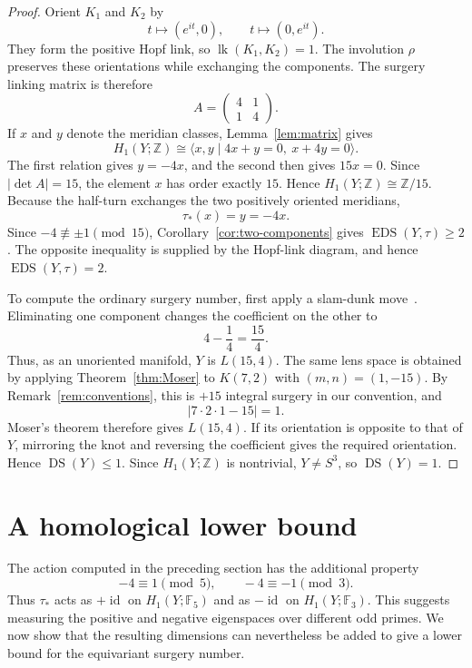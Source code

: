 \documentclass[11pt]{amsart}
\newcommand{\DS}{\operatorname{DS}}
\newcommand{\EDS}{\operatorname{EDS}}
\newcommand{\id}{\operatorname{id}}
\newcommand{\lk}{\operatorname{lk}}
\newcommand{\F}{\mathbb{F}}
\newcommand{\Z}{\mathbb{Z}}
\theoremstyle{definition}
\theoremstyle{remark}
\begin{document}
\begin{proof}
Orient $K_1$ and $K_2$ by
\[
   t\longmapsto(e^{it},0),
   \qquad
   t\longmapsto(0,e^{it}).
\]
They form the positive Hopf link, so $\lk(K_1,K_2)=1$. The involution $\rho$ preserves these orientations while exchanging the components. The surgery linking matrix is therefore
\[
   A=\begin{pmatrix}4&1\\[2pt]1&4\end{pmatrix}.
\]
If $x$ and $y$ denote the meridian classes, Lemma~\ref{lem:matrix} gives
\[
   H_1(Y;\Z)
   \cong
   \langle x,y\mid 4x+y=0,\ x+4y=0\rangle.
\]
The first relation gives $y=-4x$, and the second then gives $15x=0$. Since $|\det A|=15$, the element $x$ has order exactly $15$. Hence $H_1(Y;\Z)\cong\Z/15$. Because the half-turn exchanges the two positively oriented meridians,
\[
   \tau_*(x)=y=-4x.
\]
Since $-4\not\equiv\pm1\pmod{15}$, Corollary~\ref{cor:two-components} gives $\EDS(Y,\tau)\geq2$. The opposite inequality is supplied by the Hopf-link diagram, and hence $\EDS(Y,\tau)=2$.

To compute the ordinary surgery number, first apply a slam-dunk move~\cite[Section~5.3]{GS}. Eliminating one component changes the coefficient on the other to
\[
   4-\frac14=\frac{15}{4}.
\]
Thus, as an unoriented manifold, $Y$ is $L(15,4)$. The same lens space is obtained by applying Theorem~\ref{thm:Moser} to $K(7,2)$ with $(m,n)=(1,-15)$. By Remark~\ref{rem:conventions}, this is $+15$ integral surgery in our convention, and
\[
   |7\cdot2\cdot1-15|=1.
\]
Moser's theorem therefore gives $L(15,4)$. If its orientation is opposite to that of $Y$, mirroring the knot and reversing the coefficient gives the required orientation. Hence $\DS(Y)\leq1$. Since $H_1(Y;\Z)$ is nontrivial, $Y\neq S^3$, so $\DS(Y)=1$.
\end{proof}

\section{A homological lower bound}

The action computed in the preceding section has the additional property
\begin{equation}\label{eq:congruences}
   -4\equiv 1\pmod5,
   \qquad
   -4\equiv -1\pmod3.
\end{equation}
Thus $\tau_*$ acts as $+\id$ on $H_1(Y;\F_5)$ and as $-\id$ on $H_1(Y;\F_3)$. This suggests measuring the positive and negative eigenspaces over different odd primes. We now show that the resulting dimensions can nevertheless be added to give a lower bound for the equivariant surgery number.
\end{document}

